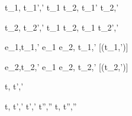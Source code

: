   {t_1,\sigma {} t_1',\sigma'}
  {t_1 \Or t_2,\sigma {} t_1' \Or t_2,\sigma'}

  {t_2,\sigma {} t_2',\sigma' }
  {t_1 \Or t_2,\sigma {} t_1 \Or t_2',\sigma'}


  {e_1,\sigma \normalise t_1,\sigma'}
  {e_1 \Xor e_2,\sigma \xrightarrow[]{\Left} t_1,\sigma'}
  [\neg\Failing(t_1,\sigma')]

  {e_2,\sigma \normalise t_2,\sigma'}
  {e_1 \Xor e_2,\sigma \xrightarrow[]{\Right} t_2,\sigma'}
  [\neg\Failing(t_2,\sigma')]




  {t,\sigma {} t',\sigma'}



  {t,\sigma {} t',\sigma' \Quad
   t',\sigma' \normalise t'',\sigma''}
  {t,\sigma {} t'',\sigma''}
